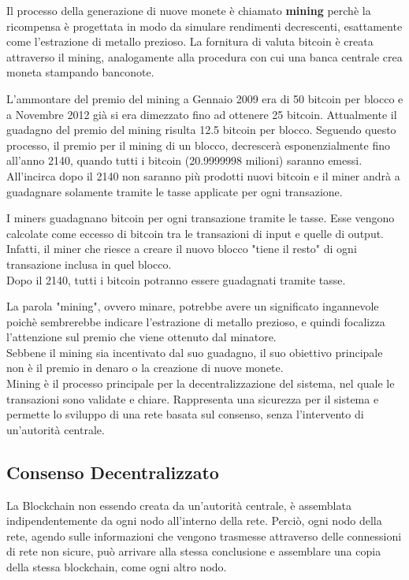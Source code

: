Il processo della generazione di nuove monete è chiamato \textbf{mining} perchè la ricompensa è progettata in modo da simulare rendimenti decrescenti, esattamente come l'estrazione di metallo prezioso.
La fornitura di valuta bitcoin è creata attraverso il mining, analogamente alla procedura con cui una banca centrale crea moneta stampando banconote. 

L'ammontare del premio del mining a Gennaio 2009 era di 50 bitcoin per blocco e a Novembre 2012 già si era dimezzato fino ad ottenere 25 bitcoin. Attualmente il guadagno del premio del mining risulta 12.5 bitcoin per blocco.
Seguendo questo processo, il premio per il mining di un blocco, decrescerà esponenzialmente fino all'anno 2140, quando tutti i bitcoin (20.9999998 milioni) saranno emessi. All'incirca dopo il 2140 non saranno più prodotti nuovi bitcoin e il miner andrà a guadagnare solamente tramite le tasse applicate per ogni transazione.

I miners guadagnano bitcoin per ogni transazione tramite le tasse. Esse vengono calcolate come eccesso di bitcoin tra le transazioni di input e quelle di output. Infatti, il miner che riesce a creare il nuovo blocco "tiene il resto" di ogni transazione inclusa in quel blocco. \\ Dopo il 2140, tutti i bitcoin potranno essere guadagnati tramite tasse.

La parola "mining", ovvero minare, potrebbe avere un significato ingannevole poichè sembrerebbe indicare l'estrazione di metallo prezioso, e quindi focalizza l'attenzione sul premio che viene ottenuto dal minatore.\\
Sebbene il mining sia incentivato dal suo guadagno, il suo obiettivo principale non è il premio in denaro o la creazione di nuove monete.\\ 
Mining è il processo principale per la decentralizzazione del sistema, nel quale le transazioni sono validate e chiare. Rappresenta una sicurezza per il sistema e permette lo sviluppo di una rete basata sul consenso, senza l'intervento di un'autorità centrale.

\subsection{Consenso Decentralizzato}

La Blockchain non essendo creata da un'autorità centrale, è assemblata indipendentemente da ogni nodo all'interno della rete. Perciò, ogni nodo della rete, agendo sulle informazioni che vengono trasmesse attraverso delle connessioni di rete non sicure, può arrivare alla stessa conclusione e assemblare una copia della stessa blockchain, come ogni altro nodo.

